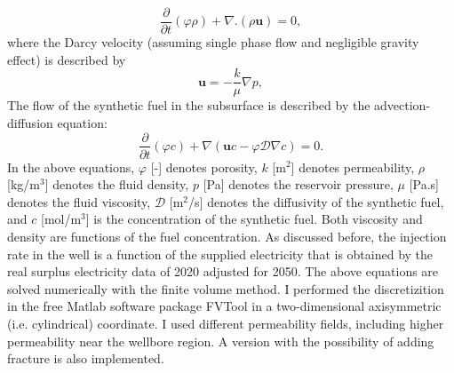 \documentclass{ECOS_2021}
\begin{document}
\begin{equation}
\frac{\partial}{\partial t}\left(\varphi\rho\right)+\nabla.\left(\rho\mathbf{u}\right)=0,\label{eq:continuity}
\end{equation}
where the Darcy velocity (assuming single phase flow and negligible
gravity effect) is described by
\begin{equation}
\mathbf{u}=-\frac{k}{\mu}\nabla p,\label{eq:darcy}
\end{equation}
The flow of the synthetic fuel in the subsurface is described by the
advection-diffusion equation:
\begin{equation}
\frac{\partial}{\partial t}\left(\varphi c\right)+\nabla\left(\mathbf{u}c-\varphi\mathcal{D}\nabla c\right)=0.\label{eq:adv-diff-single}
\end{equation}
In the above equations, $\varphi$ {[}-{]} denotes porosity, $k$
{[}m$^{2}${]} denotes permeability, $\rho$ {[}kg/m$^{3}${]} denotes
the fluid density, $p$ {[}Pa{]} denotes the reservoir pressure, $\mu$
{[}Pa.s{]} denotes the fluid viscosity, $\mathcal{D}$ {[}m$^{2}$/s{]}
denotes the diffusivity of the synthetic fuel, and $c$ {[}mol/m$^{3}${]}
is the concentration of the synthetic fuel. Both viscosity and density
are functions of the fuel concentration. As discussed before, the
injection rate in the well is a function of the supplied electricity
that is obtained by the real surplus electricity data of 2020 adjusted
for 2050. The above equations are solved numerically with the finite
volume method. I performed the discretizition in the free Matlab
software package FVTool \cite{eftekhariFVToolFiniteVolume2015b} in
a two-dimensional axisymmetric (i.e. cylindrical) coordinate. I used
different permeability fields, including higher permeability near
the wellbore region. A version with the possibility of adding fracture
is also implemented.
\end{document}
